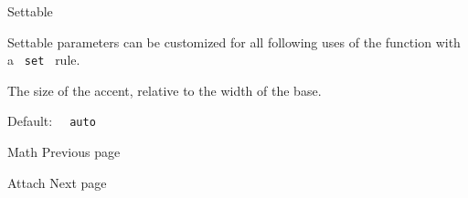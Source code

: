 {{ Settable }}

\label{parameters-size-settable-tooltip}
Settable parameters can be customized for all following uses of the
function with a \texttt{\ set\ } rule.

The size of the accent, relative to the width of the base.

Default: \texttt{\ }{\texttt{\ auto\ }}\texttt{\ }

\href{/docs/reference/math/}{\pandocbounded{}}

{ Math } { Previous page }

\href{/docs/reference/math/attach/}{\pandocbounded{}}

{ Attach } { Next page }

